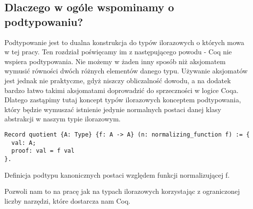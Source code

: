 \subsection{Dlaczego w ogóle wspominamy o podtypowaniu?}
Podtypowanie jest to dualna konstrukcja do typów ilorazowych o których mowa w tej pracy. Ten rozdział poświęcamy im z następującego powodu - Coq nie wspiera podtypowania. Nie możemy w żaden inny sposób niż aksjomatem wymusić równości dwóch różnych elementów danego typu. Używanie aksjomatów jest jednak nie praktyczne, gdyż niszczy obliczalność dowodu, a na dodatek bardzo łatwo takimi aksjomatami doprowadzić do sprzeczności w logice Coqa. Dlatego zastąpimy tutaj koncept typów ilorazowych konceptem podtypowania, który będzie wymuszać istnienie jedynie normalnych postaci danej klasy abstrakcji w naszym typie ilorazowym. 
\begin{code}
\begin{verbatim}
Record quotient {A: Type} {f: A -> A} (n: normalizing_function f) := {
  val: A;
  proof: val = f val
}.
\end{verbatim}
\caption{Definicja podtypu kanonicznych postaci względem funkcji normalizującej f.}
\end{code}
Pozwoli nam to na pracę jak na typach ilorazowych korzystając z ograniczonej liczby narzędzi, które dostarcza nam Coq. 
